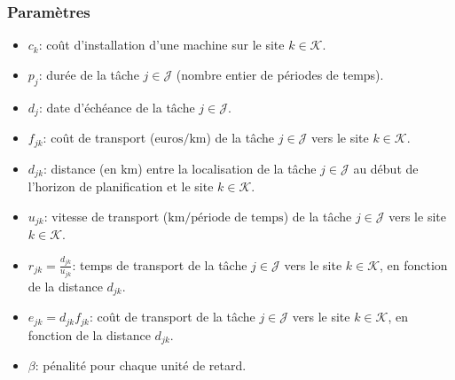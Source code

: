 \subsubsection{Paramètres}
\begin{itemize}
    \item \(c_{k}\): coût d'installation d'une machine sur le site \(k \in \mathcal{K}\).
    \item \(p_{j}\): durée de la tâche \(j \in \mathcal{J}\) (nombre entier de périodes de temps).
    \item \(d_{j}\): date d'échéance de la tâche \(j \in \mathcal{J}\).
    \item \(f_{jk}\): coût de transport (\( \text{euros/km}\)) de la tâche \(j \in \mathcal{J}\) vers le site \(k \in \mathcal{K}\).
    \item \(d_{jk}\): distance (en km) entre la localisation de la tâche \(j \in \mathcal{J}\) au début de l'horizon de planification et le site \(k \in \mathcal{K}\).
    \item \(u_{jk}\): vitesse de transport (\(\text{km/période de temps}\)) de la tâche \(j \in \mathcal{J}\) vers le site \(k \in \mathcal{K}\).
    \item \(r_{jk} = \frac{d_{jk}}{u_{jk}}\): temps de transport de la tâche \(j \in \mathcal{J}\) vers le site \(k \in \mathcal{K}\), en fonction de la distance \(d_{jk}\).
    \item \(e_{jk} = d_{jk} f_{jk}\): coût de transport de la tâche \(j \in \mathcal{J}\) vers le site \(k \in \mathcal{K}\), en fonction de la distance \(d_{jk}\).
    \item \(\beta\): pénalité pour chaque unité de retard.
\end{itemize}

